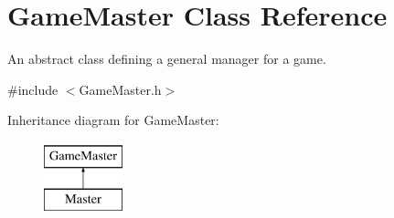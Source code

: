 \hypertarget{class_game_master}{}\section{Game\+Master Class Reference}
\label{class_game_master}


An abstract class defining a general manager for a game.  




{\ttfamily \#include $<$Game\+Master.\+h$>$}

Inheritance diagram for Game\+Master\+:\begin{figure}[H]
\begin{center}
\leavevmode
\includegraphics[height=2.000000cm]{class_game_master}
\end{center}
\end{figure}
